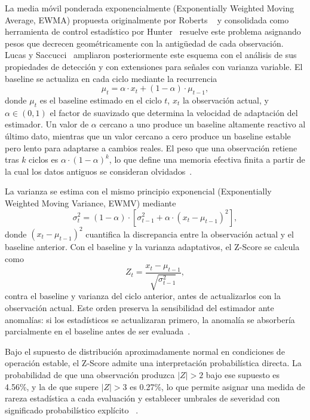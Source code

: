 La media móvil ponderada exponencialmente (Exponentially Weighted 
Moving Average, EWMA) propuesta originalmente por Roberts 
~\cite{roberts1959ewma} y consolidada como herramienta de control 
estadístico por Hunter~\cite{hunter1986ewma} resuelve este problema 
asignando pesos que decrecen geométricamente con la antigüedad de 
cada observación. Lucas y Saccucci~\cite{lucas1990ewma} ampliaron 
posteriormente este esquema con el análisis de sus propiedades de 
detección y con extensiones para señales con varianza variable. El 
baseline se actualiza en cada ciclo mediante la recurrencia
\begin{equation}
\mu_t = \alpha \cdot x_t + (1-\alpha) \cdot \mu_{t-1},
\label{eq:ewma}
\end{equation}
donde $\mu_t$ es el baseline estimado en el ciclo $t$, $x_t$ la 
observación actual, y $\alpha \in (0,1)$ el factor de suavizado que 
determina la velocidad de adaptación del estimador. Un valor de 
$\alpha$ cercano a uno produce un baseline altamente reactivo al 
último dato, mientras que un valor cercano a cero produce un 
baseline estable pero lento para adaptarse a cambios reales. El 
peso que una observación retiene tras $k$ ciclos es 
$\alpha \cdot (1-\alpha)^k$, lo que define una memoria efectiva 
finita a partir de la cual los datos antiguos se consideran 
olvidados~\cite{lucas1990ewma}.

La varianza se estima con el mismo principio exponencial 
(Exponentially Weighted Moving Variance, EWMV) mediante
\begin{equation}
{\sigma^2_t = (1-\alpha) \cdot \left[\sigma^2_{t-1} + \alpha \cdot (x_t - \mu_{t-1})^2\right],}
\label{eq:ewmv}
\end{equation}
donde $(x_t - \mu_{t-1})^2$ cuantifica la discrepancia entre la 
observación actual y el baseline anterior. Con el baseline y la 
varianza adaptativos, el Z-Score se calcula como
\begin{equation}
Z_t = \frac{x_t - \mu_{t-1}}{\sqrt{\sigma^2_{t-1}}},
\label{eq:zscore}
\end{equation}
contra el baseline y varianza del ciclo anterior, antes de 
actualizarlos con la observación actual. Este orden preserva la 
sensibilidad del estimador ante anomalías: si los estadísticos se 
actualizaran primero, la anomalía se absorbería parcialmente en el 
baseline antes de ser evaluada~\cite{montgomery2013spc}.

Bajo el supuesto de distribución aproximadamente normal en 
condiciones de operación estable, el Z-Score admite una 
interpretación probabilística directa. La probabilidad de que una 
observación produzca $|Z|>2$ bajo ese supuesto es 4.56\%, y la de 
que supere $|Z|>3$ es 0.27\%, lo que permite asignar una medida de 
rareza estadística a cada evaluación y establecer umbrales de 
severidad con significado probabilístico explícito 
~\cite{montgomery2013spc}.

